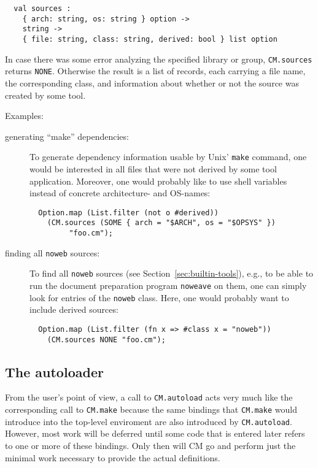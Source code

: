 \documentclass[titlepage,letterpaper]{article}
\begin{document}
\begin{verbatim}
  val sources :
    { arch: string, os: string } option ->
    string ->
    { file: string, class: string, derived: bool } list option
\end{verbatim}

In case there was some error analyzing the specified library or group,
{\tt CM.sources} returns {\tt NONE}.  Otherwise the result is a list
of records, each carrying a file name, the corresponding class, and
information about whether or not the source was created by some tool.

Examples:

\begin{description}
\item[generating ``make'' dependencies:]
To generate dependency information usable by Unix' {\tt make} command,
one would be interested in all files that were not derived by some
tool application.  Moreover, one would probably like to use shell
variables instead of concrete architecture- and OS-names:
\begin{verbatim}
  Option.map (List.filter (not o #derived))
    (CM.sources (SOME { arch = "$ARCH", os = "$OPSYS" })
         "foo.cm");
\end{verbatim}
\item[finding all {\tt noweb} sources:]
To find all {\tt noweb} sources (see Section~\ref{sec:builtin-tools}),
e.g., to be able to run the document preparation program {\tt noweave}
on them, one can simply look for entries of the {\tt noweb} class.
Here, one would probably want to include derived sources:
\begin{verbatim}
  Option.map (List.filter (fn x => #class x = "noweb"))
    (CM.sources NONE "foo.cm");
\end{verbatim}
\end{description}

\subsection{The autoloader}
\label{sec:autoload}

From the user's point of view, a call to {\tt CM.autoload} acts very
much like the corresponding call to {\tt CM.make} because the same
bindings that {\tt CM.make} would introduce into the top-level
enviroment are also introduced by {\tt CM.autoload}.  However, most
work will be deferred until some code that is entered later refers to
one or more of these bindings.  Only then will CM go and perform just
the minimal work necessary to provide the actual definitions.
\end{document}
